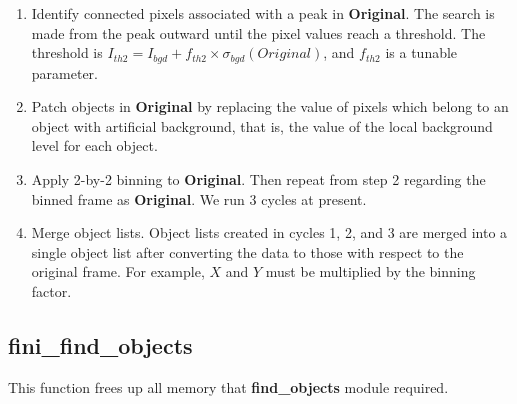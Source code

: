 \begin{enumerate}
\item Identify connected pixels associated with a peak in {\bf Original}.
    The search is made from the peak outward until the pixel values
    reach a threshold. The threshold is
    $I_{th2}=I_{bgd}+f_{th2}\times\sigma_{bgd}(Original)$, and
     $f_{th2}$  is a tunable parameter.

\item Patch objects in {\bf Original} by replacing the 
    value of pixels which belong to
    an object with artificial background, that is, the value of
     the local background level for each object.

\item Apply 2-by-2 binning to {\bf Original}. Then repeat from step 2
    regarding the binned frame as {\bf Original}. We run 3 cycles at
    present.

\item Merge object lists. Object lists created in cycles 
      1, 2, and 3 are 
      merged into a single object list after converting the data to 
      those with respect to the original frame. For example,
      $X$ and $Y$ must be multiplied by the binning factor.

\end{enumerate}

\subsection{fini\_find\_objects}

This function frees up all memory that {\bf find\_objects} module
required.
